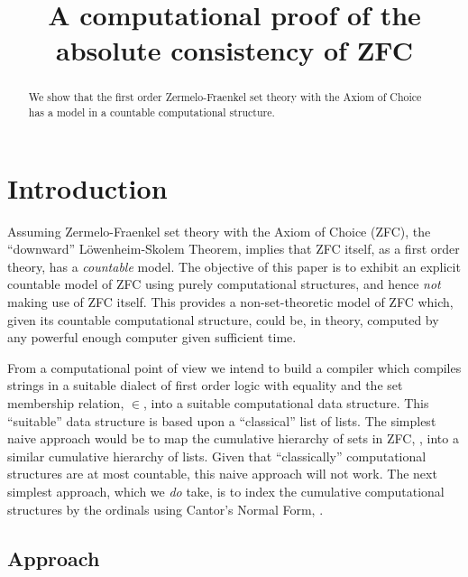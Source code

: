 \documentclass[a4paper,openany]{amsart}
\begin{document}
\sloppy

\title[ZFC is absolutely consistent]
{A computational proof of the absolute consistency of ZFC}

%

\begin{abstract}
We show that the first order Zermelo-Fraenkel set theory with the Axiom of
Choice has a model in a countable computational structure.
\end{abstract} 
\maketitle 
\tableofcontents 

\section{Introduction}

Assuming Zermelo-Fraenkel set theory with the Axiom of Choice (ZFC), the
``downward'' L\"owenheim-Skolem Theorem, \cite[Theorem 12.1, page
157]{jech2003setTheory} implies that ZFC itself, as a first order theory, has a
\emph{countable} model. The objective of this paper is to exhibit an explicit
countable model of ZFC using purely computational structures, and hence
\emph{not} making use of ZFC itself. This provides a non-set-theoretic model of
ZFC which, given its countable computational structure, could be, in theory,
computed by any powerful enough computer given sufficient time.

From a computational point of view we intend to build a compiler which compiles
strings in a suitable dialect of first order logic with equality and the set
membership relation, $\in$, into a suitable computational data structure. This
``suitable'' data structure is based upon a ``classical'' list of lists. The
simplest naive approach would be to map the cumulative hierarchy of sets in ZFC,
\cite[Lemma 6.3]{jech2003setTheory}, into a similar cumulative hierarchy of
lists. Given that ``classically'' computational structures are at most
countable, this naive approach will not work. The next simplest approach, which
we \emph{do} take, is to index the cumulative computational structures by the
ordinals using Cantor’s Normal Form, \cite[Theorem 2.26 ]{jech2003setTheory}.

\subsection{Approach}
\end{document}
